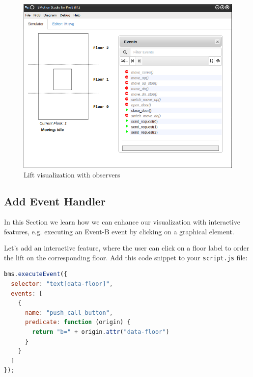 \begin{figure}[!ht]
\begin{center}
	\includegraphics[width=12cm]{img/tutorial/tut_04.png}
	\caption{Lift visualization with observers}
	\label{fig_tut_04_running2}
\end{center}
\end{figure}

\subsection{Add Event Handler}

In this Section we learn how we can enhance our visualization with interactive features, e.g. executing an Event-B event by clicking on a graphical element.


Let's add an interactive feature, where the user can click on a floor label to order the lift on the corresponding floor.
Add this code snippet to your \texttt{script.js} file:
\newpage
\begin{lstlisting}[language=JavaScript, caption={Example of an Execute Event Handler (JavaScript)}]
bms.executeEvent({
  selector: "text[data-floor]",
  events: [
    {
      name: "push_call_button", 
      predicate: function (origin) {
        return "b=" + origin.attr("data-floor")
      }
    }
  ]
});
\end{lstlisting}

